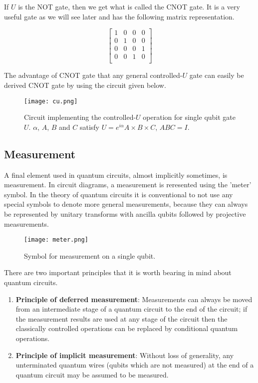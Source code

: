 If $U$ is the NOT gate, then we get what is called the CNOT gate. It is a very useful gate as we will see later and has the following matrix representation.

$$\begin{bmatrix}
1&0&0&0\\
0&1&0&0\\
0&0&0&1\\
0&0&1&0\\
\end{bmatrix}$$
\vspace{1em}

The advantage of CNOT gate that any general controlled-$U$ gate can easily be derived CNOT gate by using the circuit given below.
\begin{figure}[h]
    \centering
    \texttt{[image: cu.png]}
    \caption{Circuit implementing the controlled-$U$ operation for single qubit gate $U$. $\alpha$, $A$, $B$ and $C$ satisfy $U = e^{i\alpha}A\times B\times C$, $ABC = I$.}
\end{figure}
\vspace{1em}

\subsection{Measurement}

A final element used in quantum circuits, almost implicitly sometimes, is measurement. In circuit diagrams, a measurement is reresented using the 'meter' symbol. In the theory of quantum circuits it is conventional to not use any special symbols to denote more general measurements, because they can always be represented by unitary transforms with ancilla qubits followed by projective measurements.
\vspace{1em}
\begin{figure}[h]
    \centering
    \texttt{[image: meter.png]}
    \caption{Symbol for measurement on a single qubit.}
\end{figure}
\vspace{1em}

There are two important principles that it is worth bearing in mind about quantum circuits.

\begin{enumerate}
    \item\textbf{Principle of deferred measurement}: Measurements can always be moved from an intermediate stage of a quantum circuit to the end of the circuit; if the measurement results are used at any stage of the circuit then the classically controlled operations can be replaced by conditional quantum operations.
    \item\textbf{Principle of implicit measurement}: Without loss of generality, any unterminated quantum wires (qubits which are not measured) at the end of a quantum circuit may be assumed to be measured.
\end{enumerate}

